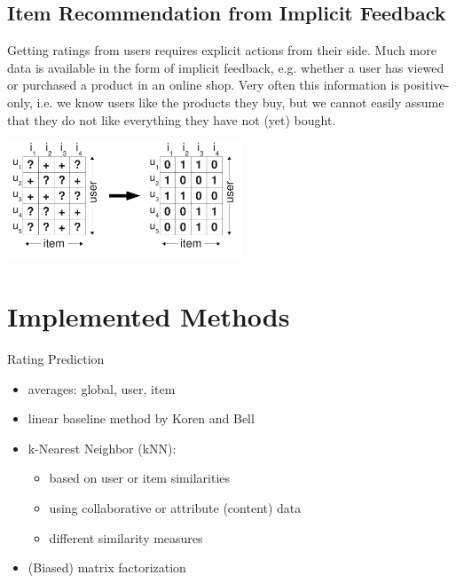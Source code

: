 \documentclass[a4paper, foldmark, 12pt]{leaflet}
\begin{document}
\subsection{Item Recommendation from Implicit Feedback}

Getting ratings from users requires explicit actions from their side.
Much more data is available in the form of implicit feedback,
e.g. whether a user has viewed or purchased a product in an online shop.
Very often this information is positive-only,
i.e. we know users like the products they buy, but we cannot easily assume
that they do not like everything they have not (yet) bought.

\begin{center}
	\includegraphics[width=7.0cm]{fig/interpretation_single.pdf}
\end{center}

\newpage 

\section{Implemented Methods}
Rating Prediction
\begin{itemize}
	\item averages: global, user, item
	\item linear baseline method by Koren and Bell
	\item k-Nearest Neighbor (kNN):
		\begin{itemize}
			\item based on user or item similarities
			\item using collaborative or attribute (content) data
			\item different similarity measures
		\end{itemize}
	\item (Biased) matrix factorization
\end{itemize}
\end{document}
